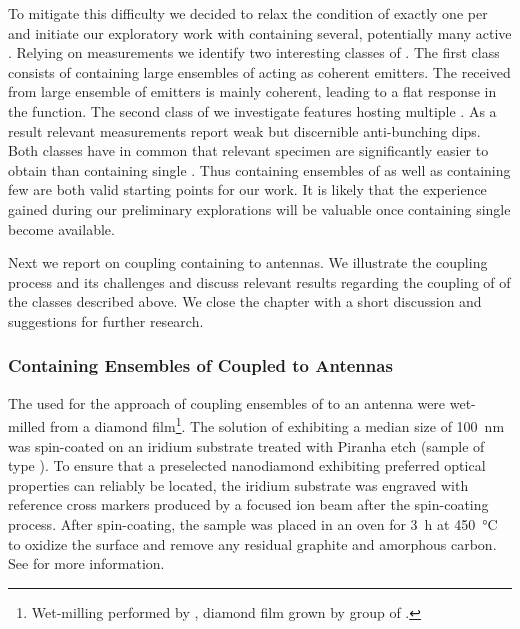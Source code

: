 		To mitigate this difficulty we decided to relax the condition of exactly one \siv per \nd and initiate our exploratory work with \nds containing several, potentially many active \sivs.
		Relying on \gt measurements we identify two interesting classes of \nds.
		The first class consists of \nds containing large ensembles of \sivs acting as coherent emitters.
		The \fl received from large ensemble of emitters is mainly coherent, leading to a flat response in the \gtz function.
		The second class of \nds we investigate features \nds hosting multiple \sivs.
		As a result relevant \gtz measurements report weak but discernible anti-bunching dips.
		Both classes have in common that relevant \nd specimen are significantly easier to obtain than \nds containing single \sivs.
		Thus \nds containing ensembles of \sivs as well as \nds containing few \sivs are both valid starting points for our work.
		It is likely that the experience gained during our preliminary explorations will be valuable once \nds containing single \sivs become available.
		
		Next we report on coupling \nds containing \sivs to antennas. We illustrate the coupling process and its challenges and discuss relevant results regarding the coupling of \nds of the classes described above. We close the chapter with a short discussion and suggestions for further research.

		\FloatBarrier

		\subsubsection{\Nds Containing Ensembles of \sivs Coupled to Antennas}\label{subsubsec::antenna_multiple_sivs}

			The \nds used for the approach of coupling ensembles of \sivs to an antenna were wet-milled from a \CVD diamond film\footnote{Wet-milling performed by \muzha, diamond film grown by group of \williams.}.
			The solution of \nds exhibiting a median size of \SI{100}{nm} was spin-coated on an iridium substrate treated with Piranha etch (sample of type \insituH).
			To ensure that a preselected nanodiamond exhibiting preferred optical properties can reliably be located, the iridium substrate was engraved with reference cross markers produced by a focused ion beam after the spin-coating process.
			After spin-coating, the sample was placed in an oven for \SI{3}{\hour} at \SI{450}{\celsius} to oxidize the surface and remove any residual graphite and amorphous carbon. See  for more information.
			
